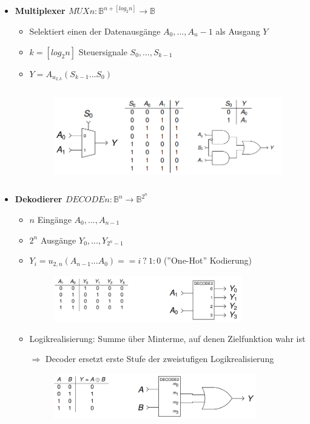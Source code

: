 \documentclass[11pt,a4paper]{article}
\begin{document}
\begin{itemize}
\item \textbf{Multiplexer $MUXn: \mathbb{B}^{n+[log_2n]} \rightarrow \mathbb{B}$}
	\begin{itemize}
	\item Selektiert einen der Datenausgänge $A_0,...,A_n-1$ als Ausgang $Y$
	\item $k = [log_2n]$ Steuersignale $S_0,...,S_{k-1}$
	\item $Y= A_{u_{2,k}}(S_{k-1}...S_0)$
	\item[] \begin{figure}[H]
				\begin{center}
				\includegraphics[height=4cm]{multiplexer}
				\end{center}
			\end{figure}
	\end{itemize}
	
\item \textbf{Dekodierer $DECODEn: \mathbb{B}^n \rightarrow \mathbb{B}^{2^n}$}
	\begin{itemize}
	\item $n$ Eingänge $A_0,...,A_{n-1}$
	\item $2^n$ Ausgänge $Y_0,...,Y_{2^n-1}$
	\item $Y_i = u_{2,n}(A_{n-1}...A_0) == i~?~ 1:0$ (''One-Hot'' Kodierung)
	\item[] \begin{figure}[H]
				\begin{center}
				\includegraphics[height=2cm]{dekodierer}
				\end{center}
			\end{figure}
	\item Logikrealisierung: Summe über Minterme, auf denen Zielfunktion wahr ist
	\item[$\Rightarrow$] Decoder ersetzt erste Stufe der zweistufigen Logikrealisierung
	\item[] \begin{figure}[H]
				\begin{center}
				\includegraphics[height=2cm]{dekodierer2}
				\end{center}
			\end{figure}
	\end{itemize}

\end{itemize}
\end{document}
